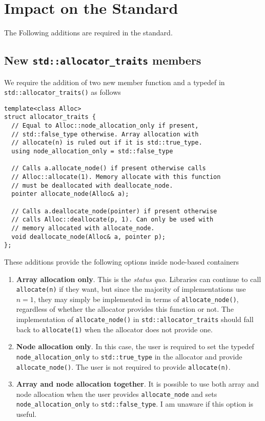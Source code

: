 \documentclass[11pt]{article}
\begin{document}
\section{Impact on the Standard} \label{impact}

The Following additions are required in the standard.

\subsection{New \texttt{std::allocator\_traits} members}

We require the addition of two new member function and
a typedef in \texttt{std::allocator\_traits()} as follows

\medskip
\begin{lstlisting}
template<class Alloc>
struct allocator_traits {
  // Equal to Alloc::node_allocation_only if present,
  // std::false_type otherwise. Array allocation with
  // allocate(n) is ruled out if it is std::true_type.
  using node_allocation_only = std::false_type

  // Calls a.allocate_node() if present otherwise calls
  // Alloc::allocate(1). Memory allocate with this function
  // must be deallocated with deallocate_node.
  pointer allocate_node(Alloc& a);

  // Calls a.deallocate_node(pointer) if present otherwise
  // calls Alloc::deallocate(p, 1). Can only be used with
  // memory allocated with allocate_node.
  void deallocate_node(Alloc& a, pointer p);
};
\end{lstlisting}
These additions provide the following options inside node-based
containers
\begin{enumerate}
\item {\bf Array allocation only}.
This is the {\it status quo}. Libraries can continue to call
\texttt{allocate(n)} if they want, but since the majority of implementations
use $n = 1$, they may simply be implemented in terms of
\texttt{allocate\_node()}, regardless of whether the allocator provides this
function or not. The implementation of \texttt{allocate\_node()} in
\texttt{std::allocator\_traits} should fall back to \texttt{allocate(1)} 
when the allocator does not provide one.

\item {\bf Node allocation only}.
In this case, the user is required to set the typedef \texttt{node\_allocation\_only}
to \texttt{std::true\_type} in the allocator and provide \texttt{allocate\_node()}. The user is
not required to provide \texttt{allocate(n)}.
\item {\bf Array and node allocation together}. It is possible to use
both array {and} node allocation when the user provides \texttt{allocate\_node}
and sets \texttt{node\_allocation\_only} to \texttt{std::false\_type}.
I am unaware if this option is useful.
\end{enumerate}
\end{document}
